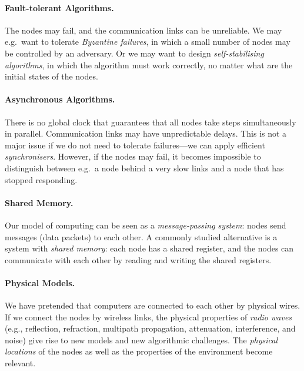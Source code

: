 \paragraph{Fault-tolerant Algorithms.}

The nodes may fail, and the communication links can be unreliable. We may e.g.\ want to tolerate \emph{Byzantine failures}, in which a small number of nodes may be controlled by an adversary. Or we may want to design \emph{self-stabilising algorithms}, in which the algorithm must work correctly, no matter what are the initial states of the nodes.


\paragraph{Asynchronous Algorithms.}

There is no global clock that guarantees that all nodes take steps simultaneously in parallel. Communication links may have unpredictable delays. This is not a major issue if we do not need to tolerate failures---we can apply efficient \emph{synchronisers}. However, if the nodes may fail, it becomes impossible to distinguish between e.g.\ a node behind a very slow links and a node that has stopped responding.


\paragraph{Shared Memory.}

Our model of computing can be seen as a \emph{message-passing system}: nodes send messages (data packets) to each other. A commonly studied alternative is a system with \emph{shared memory}: each node has a shared register, and the nodes can communicate with each other by reading and writing the shared registers.


\paragraph{Physical Models.}

We have pretended that computers are connected to each other by physical wires. If we connect the nodes by wireless links, the physical properties of \emph{radio waves} (e.g., reflection, refraction, multipath propagation, attenuation, interference, and noise) give rise to new models and new algorithmic challenges. The \emph{physical locations} of the nodes as well as the properties of the environment become relevant.


